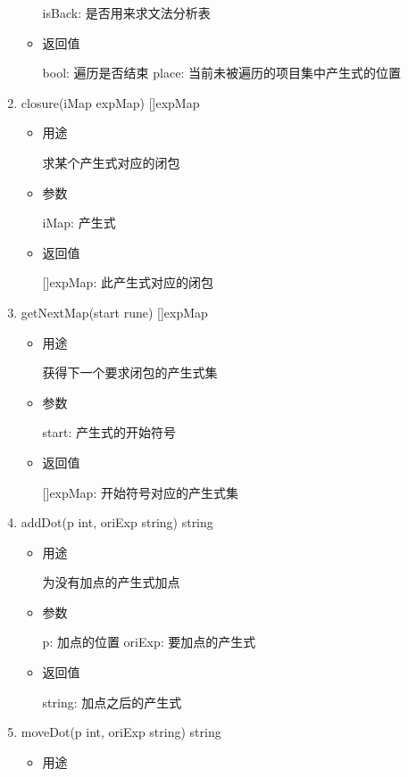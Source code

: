 \documentclass[fontset=none,UTF8,a4paper,zihao=-4]{ctexart}
\begin{document}
\begin{enumerate}
\begin{itemize}
isBack: 是否用来求文法分析表

\item 返回值

bool:  遍历是否结束
place: 当前未被遍历的项目集中产生式的位置
\end{itemize}

\item closure(iMap expMap) []expMap

\begin{itemize}
\item 用途

求某个产生式对应的闭包

\item 参数

iMap: 产生式

\item 返回值

[]expMap: 此产生式对应的闭包
\end{itemize}

\item getNextMap(start rune) []expMap

\begin{itemize}
\item 用途

获得下一个要求闭包的产生式集

\item 参数

start: 产生式的开始符号

\item 返回值

[]expMap: 开始符号对应的产生式集
\end{itemize}

\item addDot(p int, oriExp string) string

\begin{itemize}
\item 用途

为没有加点的产生式加点

\item 参数

p:      加点的位置
oriExp: 要加点的产生式

\item 返回值

string: 加点之后的产生式
\end{itemize}

\item moveDot(p int, oriExp string) string

\begin{itemize}
\item 用途


\end{itemize}
\end{enumerate}
\end{document}
